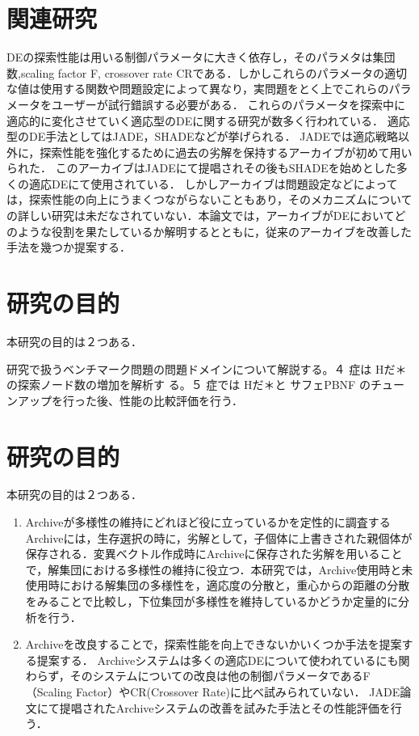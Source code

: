 \documentclass[a4paper,11pt,oneside,openany]{jsbook}
\begin{document}
\section{関連研究}
DEの探索性能は用いる制御パラメータに大きく依存し，そのパラメタは集団数,scaling factor F, crossover rate CRである．しかしこれらのパラメータの適切な値は使用する関数や問題設定によって異なり，実問題をとく上でこれらのパラメータをユーザーが試行錯誤する必要がある．
これらのパラメータを探索中に適応的に変化させていく適応型のDEに関する研究が数多く行われている．
適応型のDE手法としてはJADE\cite{JADE}，SHADE\cite{SHADE}などが挙げられる．
JADEでは適応戦略以外に，探索性能を強化するために過去の劣解を保持するアーカイブが初めて用いられた．
このアーカイブはJADEにて提唱されその後もSHADEを始めとした多くの適応DEにて使用されている．
しかしアーカイブは問題設定などによっては，探索性能の向上にうまくつながらないこともあり，そのメカニズムについての詳しい研究は未だなされていない．本論文では，アーカイブがDEにおいてどのような役割を果たしているか解明するとともに，従来のアーカイブを改善した手法を幾つか提案する．

\section{研究の目的}
本研究の目的は２つある．

研究で扱うベンチマーク問題の問題ドメインについて解説する。４ 症は Hだ＊の探索ノード数の増加を解析す
る。５ 症では Hだ＊と サフェPBNF のチューンアップを行った後、性能の比較評価を行う．

\section{研究の目的}
本研究の目的は２つある．
\begin{enumerate}
\item Archiveが多様性の維持にどれほど役に立っているかを定性的に調査する
\vspace{3mm}
\newline
Archiveには，生存選択の時に，劣解として，子個体に上書きされた親個体が保存される．変異ベクトル作成時にArchiveに保存された劣解を用いることで，解集団における多様性の維持に役立つ．本研究では，Archive使用時と未使用時における解集団の多様性を，適応度の分散と，重心からの距離の分散をみることで比較し，下位集団が多様性を維持しているかどうか定量的に分析を行う．
\newline


\item Archiveを改良することで，探索性能を向上できないかいくつか手法を提案する提案する．
\vspace{3mm}
\newline
Archiveシステムは多くの適応DEについて使われているにも関わらず，そのシステムについての改良は他の制御パラメータであるF（Scaling Factor）やCR(Crossover Rate)に比べ試みられていない．
JADE論文にて提唱されたArchiveシステムの改善を試みた手法とその性能評価を行う．


\end{enumerate}
\end{document}
